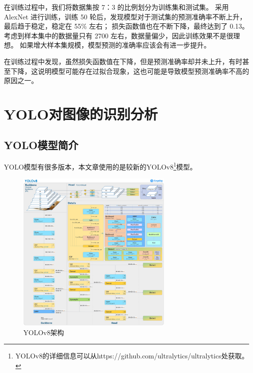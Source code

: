 \documentclass[UTF8]{ctexart}
\begin{document}
在训练过程中，我们将数据集按 7：3 的比例划分为训练集和测试集。
采用 AlexNet 进行训练，训练 50 轮后，发现模型对于测试集的预测准确率不断上升，最后趋于稳定，稳定在 55\% 左右；
损失函数值也在不断下降，最终达到了 0.13。考虑到样本集中的数据量只有 2700 左右，数据量偏少，因此训练效果不是很理想。
如果增大样本集规模，模型预测的准确率应该会有进一步提升。 \par
在训练过程中发现，虽然损失函数值在下降，但是预测准确率却并未上升，有时甚至下降，这说明模型可能存在过拟合现象，这也可能是导致模型预测准确率不高的原因之一。

\section{YOLO对图像的识别分析}

\subsection{YOLO模型简介}
YOLO模型有很多版本，本文章使用的是较新的YOLOv8\footnote{YOLOv8的详细信息可以从https://github.com/ultralytics/ultralytics处获取。}模型。


\begin{figure}
    \centering %
    \includegraphics[height=8cm]{../YOLO/pics/img1.png}
    \caption{YOLOv8架构}
\end{figure}
\end{document}
